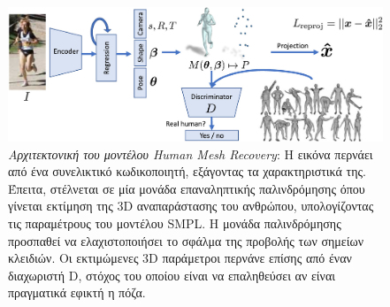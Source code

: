  \begin{figure}[H]
	\centering
	\includegraphics[scale=1.5]{images/chapter3/hmr_architecture.jpg}
	\caption[Αρχιτεκτονική του μοντέλου Human Mesh Recovery]{\textsl{Αρχιτεκτονική του μοντέλου Human Mesh Recovery}: H εικόνα περνάει από ένα συνελικτικό κωδικοποιητή, εξάγοντας τα χαρακτηριστικά της. Έπειτα, στέλνεται σε μία μονάδα επαναληπτικής παλινδρόμησης όπου γίνεται εκτίμηση της 3D αναπαράστασης του ανθρώπου, υπολογίζοντας τις παραμέτρους του μοντέλου SMPL. Η μονάδα παλινδρόμησης προσπαθεί να ελαχιστοποιήσει το σφάλμα της προβολής των σημείων κλειδιών. Οι εκτιμώμενες 3D παράμετροι περνάνε επίσης από έναν διαχωριστή D, στόχος του οποίου είναι να επαληθεύσει αν είναι πραγματικά εφικτή η πόζα.}
	\label{fig:hmr_architecture}
\end{figure}

